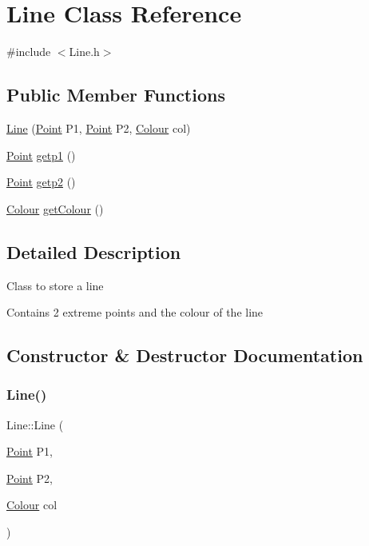 \hypertarget{classLine}{}\section{Line Class Reference}
\label{classLine}


{\ttfamily \#include $<$Line.\+h$>$}

\subsection*{Public Member Functions}
\begin{DoxyCompactItemize}
\item 
\hyperlink{classLine_a5572c554449bab0a59afff79e7e9cbe7}{Line} (\hyperlink{classPoint}{Point} P1, \hyperlink{classPoint}{Point} P2, \hyperlink{classColour}{Colour} col)
\item 
\hyperlink{classPoint}{Point} \hyperlink{classLine_a7a69f0f05c2794cce92bb6f35542c985}{getp1} ()
\item 
\hyperlink{classPoint}{Point} \hyperlink{classLine_ad63f04296d5912d355d4a9549f6775e2}{getp2} ()
\item 
\hyperlink{classColour}{Colour} \hyperlink{classLine_a6cfda277058464af15578d64f37bec51}{get\+Colour} ()
\end{DoxyCompactItemize}


\subsection{Detailed Description}
Class to store a line

Contains 2 extreme points and the colour of the line 

\subsection{Constructor \& Destructor Documentation}
\mbox{\label{classLine_a5572c554449bab0a59afff79e7e9cbe7}} 
\subsubsection{\texorpdfstring{Line()}{Line()}}
{\footnotesize\ttfamily Line\+::\+Line (\begin{DoxyParamCaption}\item[{\hyperlink{classPoint}{Point}}]{P1,  }\item[{\hyperlink{classPoint}{Point}}]{P2,  }\item[{\hyperlink{classColour}{Colour}}]{col }\end{DoxyParamCaption})}

